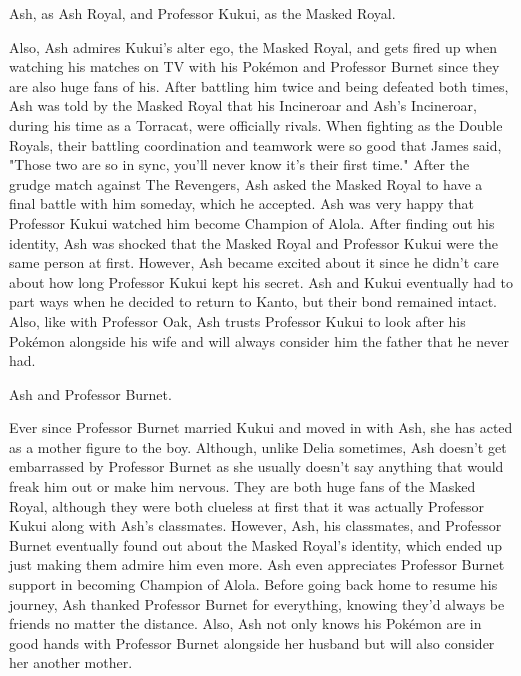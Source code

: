 \documentclass[a4paper,12pt]{article}
\begin{document}
Ash, as Ash Royal, and Professor Kukui, as the Masked Royal.\\ \par \vspace{0.5cm}

Also, Ash admires Kukui's alter ego, the Masked Royal, and gets fired up when watching his matches on TV with his Pokémon and Professor Burnet since they are also huge fans of his. After battling him twice and being defeated both times, Ash was told by the Masked Royal that his Incineroar and Ash's Incineroar, during his time as a Torracat, were officially rivals. When fighting as the Double Royals, their battling coordination and teamwork were so good that James said, "Those two are so in sync, you'll never know it's their first time." After the grudge match against The Revengers, Ash asked the Masked Royal to have a final battle with him someday, which he accepted. Ash was very happy that Professor Kukui watched him become Champion of Alola. After finding out his identity, Ash was shocked that the Masked Royal and Professor Kukui were the same person at first. However, Ash became excited about it since he didn't care about how long Professor Kukui kept his secret. Ash and Kukui eventually had to part ways when he decided to return to Kanto, but their bond remained intact. Also, like with Professor Oak, Ash trusts Professor Kukui to look after his Pokémon alongside his wife and will always consider him the father that he never had.\\ \par \vspace{0.5cm}

Ash and Professor Burnet.\\ \par \vspace{0.5cm}

Ever since Professor Burnet married Kukui and moved in with Ash, she has acted as a mother figure to the boy. Although, unlike Delia sometimes, Ash doesn't get embarrassed by Professor Burnet as she usually doesn't say anything that would freak him out or make him nervous. They are both huge fans of the Masked Royal, although they were both clueless at first that it was actually Professor Kukui along with Ash's classmates. However, Ash, his classmates, and Professor Burnet eventually found out about the Masked Royal's identity, which ended up just making them admire him even more. Ash even appreciates Professor Burnet support in becoming Champion of Alola. Before going back home to resume his journey, Ash thanked Professor Burnet for everything, knowing they'd always be friends no matter the distance. Also, Ash not only knows his Pokémon are in good hands with Professor Burnet alongside her husband but will also consider her another mother.\\ \par \vspace{0.5cm}
\end{document}
